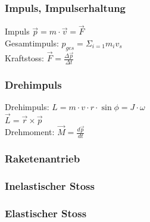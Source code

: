 \subsubsection{Impuls, Impulserhaltung}
Impuls $ \overrightarrow{p} = m \cdot \overrightarrow{v} = \overrightarrow{F}$  \\
Gesamtimpuls: $ p_{ges} = \Sigma_{i = 1} m_{i}v_{s} $\\
Kraftstoss: $\overrightarrow{F} = \frac{\Delta \overrightarrow{p}}{ \Delta t}$

\subsubsection{Drehimpuls}
Drehimpuls: $L = m \cdot v \cdot r \cdot \sin{\phi} = J \cdot \omega$ \\
$\overrightarrow{L} = \overrightarrow{r} \times \overrightarrow{p}$ \\
Drehmoment: $ \overrightarrow{M} = \frac{d \overrightarrow{p}}{dt}
$

\subsubsection{Raketenantrieb}

\subsubsection{Inelastischer Stoss}

\subsubsection{Elastischer Stoss}


